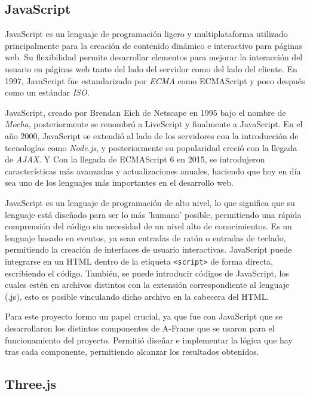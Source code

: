 \documentclass[a4paper, 12pt]{book}
\begin{document}
\subsection{JavaScript}
\label{subsec:JavaScript}
JavaScript \cite{mdn2024} es un lenguaje de programación ligero y multiplataforma utilizado principalmente para la creación de contenido dinámico e interactivo para páginas web.
Su flexibilidad permite desarrollar elementos para mejorar la interacción del usuario en páginas web tanto del lado del servidor como del lado del cliente. En 1997, JavaScript fue estandarizado
por \textit{ECMA} como ECMAScript y poco después como un estándar \textit{ISO}.

JavaScript, creado por Brendan Eich de Netscape en 1995 bajo el nombre de \textit{Mocha}, posteriormente se renombró a LiveScript y finalmente a JavaScript.
En el año 2000, JavaScript se extendió al lado de los servidores con la introducción de tecnologías como \textit{Node.js}, y posteriormente su popularidad creció con la llegada de \textit{AJAX}. Y Con la llegada de ECMAScript 6 en 2015, se introdujeron características más avanzadas y
actualizaciones anuales, haciendo que hoy en día sea uno de los lenguajes más importantes en el desarrollo web.

JavaScript es un lenguaje de programación de alto nivel, lo que significa que su lenguaje está diseñado para ser lo más 'humano' posible, permitiendo una rápida comprensión del código sin necesidad de un nivel alto de conocimientos.
Es un lenguaje basado en eventos, ya sean entradas de ratón o entradas de teclado, permitiendo la creación de interfaces de usuario interactivas. JavaScript puede integrarse en un HTML dentro de la etiqueta \texttt{<script>} de forma directa, escribiendo el código.
También, se puede introducir códigos de JavaScript, los cuales estén en archivos distintos con la extensión correspondiente al lenguaje (.js), esto es posible vinculando dicho archivo en la cabecera del HTML.

Para este proyecto formo un papel crucial, ya que fue con JavaScript que se desarrollaron los distintos componentes de A-Frame que se usaron para el funcionamiento del proyecto. Permitió diseñar e implementar la lógica que hay tras cada componente, permitiendo alcanzar los resultados obtenidos.

\subsection{Three.js}
\label{subsec:Threejs}
\end{document}
